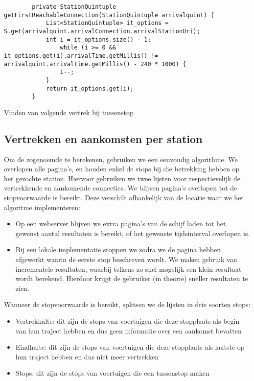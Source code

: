 \begin{code}[h]
	\begin{verbatim}
		private StationQuintuple getFirstReachableConnection(StationQuintuple arrivalquint) {
			List<StationQuintuple> it_options = S.get(arrivalquint.arrivalConnection.arrivalStationUri);
			int i = it_options.size() - 1;
				while (i >= 0 && it_options.get(i).arrivalTime.getMillis() != arrivalquint.arrivalTime.getMillis() - 240 * 1000) {
				i--;
			}
			return it_options.get(i);
		}
	\end{verbatim}
	\caption[CSA: Journey extraction bij tussenstops]{Vinden van volgende vertrek bij tussenstop}
	\label{code:2:csaJourneyExtractionReachable}
\end{code}

\subsection{Vertrekken en aankomsten per station}
Om de zogenoemde  te berekenen, gebruiken we een eenvoudig algorithme. We overlopen alle pagina's, en houden enkel de stops bij die betrekking hebben op het gezochte station. Hiervoor gebruiken we twee lijsten voor respectievelijk de vertrekkende en aankomende connecties. We blijven pagina's overlopen tot de stopvoorwaarde is bereikt. Deze verschilt afhankelijk van de locatie waar we het algoritme implementeren:
\begin{itemize}
	\item Op een webserver blijven we extra pagina's van de schijf laden tot het gewenst aantal resultaten is bereikt, of het gewenste tijdsinterval overlopen is.
	\item Bij een lokale implementatie stoppen we zodra we de pagina hebben afgewerkt waarin de eerste stop beschreven wordt. We maken gebruik van incrementele resultaten, waarbij telkens zo snel mogelijk een klein resultaat wordt berekend. Hierdoor krijgt de gebruiker (in theorie) sneller resultaten te zien.
\end{itemize}

Wanneer de stopvoorwaarde is bereikt, splitsen we de lijsten in drie soorten stops:
\begin{itemize}
	\item Vertrekhalte:  dit zijn de stops van voertuigen die deze stopplaats als begin van hun traject hebben en dus geen informatie over een aankomst bevatten
	\item Eindhalte: dit zijn de stops van voertuigen die deze stopplaats als laatste op hun traject hebben en dus niet meer vertrekken
	\item Stops: dit zijn de stops van voertuigen die een tussenstop maken
\end{itemize}

